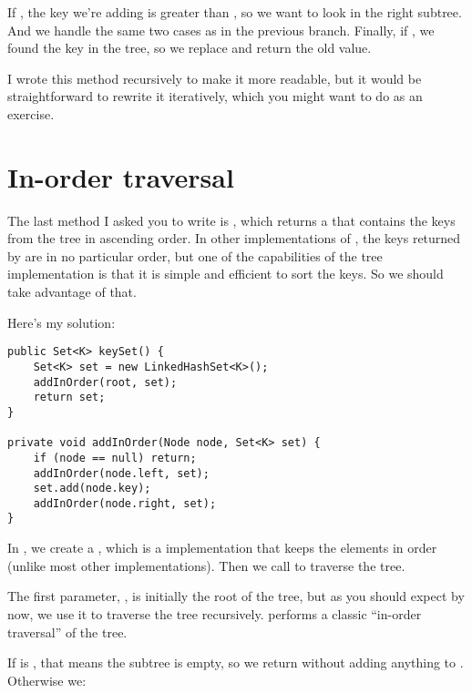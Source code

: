 \documentclass[12pt]{book}
\theoremstyle{exercise}
\begin{document}
If , the key we're adding is greater than
, so we want to look in the right subtree. And we
handle the same two cases as in the previous branch.
Finally, if , we found the key in the tree, so we
replace and return the old value.


I wrote this method recursively to make it more readable, but it would
be straightforward to rewrite it iteratively, which you might want to
do as an exercise.


\section{In-order traversal}
\label{in-order-traversal}

The last method I asked you to write is , which returns
a  that contains the keys from the tree in ascending order.
In other implementations of , the keys returned by
 are in no particular order, but one of the capabilities
of the tree implementation is that it is simple and efficient to sort
the keys. So we should take advantage of that.


Here's my solution:

\begin{verbatim}
public Set<K> keySet() {
    Set<K> set = new LinkedHashSet<K>();
    addInOrder(root, set);
    return set;
}

private void addInOrder(Node node, Set<K> set) {
    if (node == null) return;
    addInOrder(node.left, set);
    set.add(node.key);
    addInOrder(node.right, set);        
}
\end{verbatim}

In , we create a , which is a
 implementation that keeps the elements in order (unlike
most other  implementations). Then we call
 to traverse the tree.


The first parameter, , is initially the root of the tree,
but as you should expect by now, we use it to traverse the tree
recursively.  performs a classic ``in-order
traversal'' of the tree.

If  is , that means the subtree is empty, so
we return without adding anything to . Otherwise we:
\end{document}
